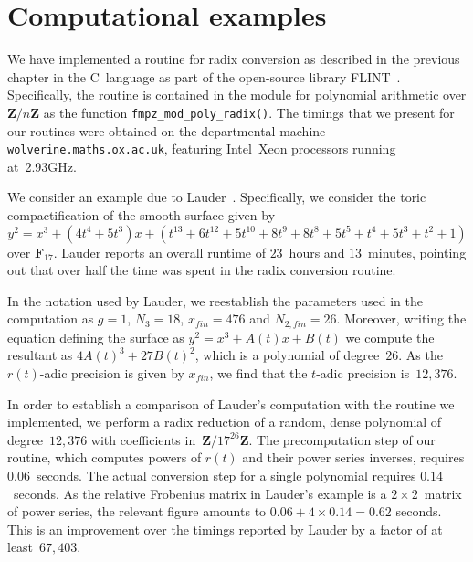 
\chapter{Computational examples}

We have implemented a routine for radix conversion as described 
in the previous chapter in the C~language as part of the open-source 
library FLINT~\citep{FLINT}.  Specifically, the routine is contained 
in the module for polynomial arithmetic over $\mathbf{Z}/n\mathbf{Z}$ 
as the function {\tt{fmpz\_mod\_poly\_radix()}}.  The timings that we 
present for our routines were obtained on the departmental machine 
{\tt{wolverine.maths.ox.ac.uk}}, featuring \mbox{Intel Xeon} processors 
running at~2.93GHz.

We consider an example due to Lauder~\citep[Example~9.1]{Lauder2006}.  
Specifically, we consider the toric compactification of the smooth 
surface given by 
\begin{equation*}
y^2 = x^3 + (4 t^4 + 5 t^3) x + 
    (t^{13} + 6 t^{12} + 5 t^{10} + 
    8 t^9 + 8 t^8 + 5 t^5 + t^4 + 5 t^3 + t^2 + 1)
\end{equation*}
over $\mathbf{F}_{17}$.  Lauder reports an overall runtime 
of $23$~hours and $13$~minutes, pointing out that over half the 
time was spent in the radix conversion routine.

In the notation used by Lauder, we reestablish the parameters used 
in the computation as $g = 1$, $N_3 = 18$, $x_{fin} = 476$ and 
$N_{2,fin} = 26$.  Moreover, writing the equation defining the surface 
as $y^2 = x^3 + A(t) x + B(t)$ we compute the resultant as 
$4 A(t)^3 + 27 B(t)^2$, which is a polynomial of degree~$26$.  As the 
$r(t)$-adic precision is given by $x_{fin}$, we find that the $t$-adic 
precision is~$12,376$.

In order to establish a comparison of Lauder's computation with the 
routine we implemented, we perform a radix reduction of a random, 
dense polynomial of degree~$12,376$ with coefficients 
in~$\mathbf{Z}/17^{26} \mathbf{Z}$.  The precomputation step of our 
routine, which computes powers of $r(t)$ and their power series 
inverses, requires $0.06$~seconds.  The actual conversion step for a 
single polynomial requires $0.14$~seconds.  As the relative Frobenius 
matrix in Lauder's example is a $2 \times 2$~matrix of power series, 
the relevant figure amounts to $0.06 + 4 \times 0.14 = 0.62$ seconds. 
This is an improvement over the timings reported by Lauder by a 
factor of at least~$67,403$.

